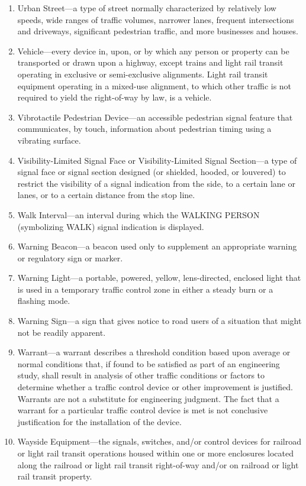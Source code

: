 \documentclass[9pt]{memoir}
\begin{document}
{\begin{enumerate}[label=\arabic*., ref=\arabic*]
\item Urban Street---a type of street normally characterized by relatively low speeds, wide ranges of traffic volumes, narrower lanes, frequent intersections and driveways, significant pedestrian traffic, and more businesses and houses.
\item Vehicle---every device in, upon, or by which any person or property can be transported or drawn upon a highway, except trains and light rail transit operating in exclusive or semi-exclusive alignments. Light rail transit equipment operating in a mixed-use alignment, to which other traffic is not required to yield the right-of-way by law, is a vehicle.
\item Vibrotactile Pedestrian Device---an accessible pedestrian signal feature that communicates, by touch, information about pedestrian timing using a vibrating surface.
\item Visibility-Limited Signal Face or Visibility-Limited Signal Section---a type of signal face or signal section designed (or shielded, hooded, or louvered) to restrict the visibility of a signal indication from the side, to a certain lane or lanes, or to a certain distance from the stop line.
\item Walk Interval---an interval during which the WALKING PERSON (symbolizing WALK) signal indication is displayed.
\item Warning Beacon---a beacon used only to supplement an appropriate warning or regulatory sign or marker.
\item Warning Light---a portable, powered, yellow, lens-directed, enclosed light that is used in a temporary traffic control zone in either a steady burn or a flashing mode.
\item Warning Sign---a sign that gives notice to road users of a situation that might not be readily apparent.
\item Warrant---a warrant describes a threshold condition based upon average or normal conditions that, if found to be satisfied as part of an engineering study, shall result in analysis of other traffic conditions or factors to determine whether a traffic control device or other improvement is justified. Warrants are not a substitute for engineering judgment. The fact that a warrant for a particular traffic control device is met is not conclusive justification for the installation of the device.
\item Wayside Equipment---the signals, switches, and/or control devices for railroad or light rail transit operations housed within one or more enclosures located along the railroad or light rail transit right-of-way and/or on railroad or light rail transit property.

\end{enumerate}}
\end{document}
